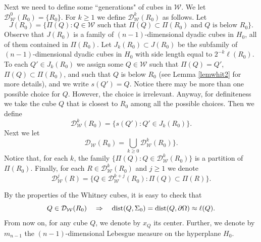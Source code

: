 \documentclass[11pt]{amsart}
\newcommand{\DD}{{\mathcal D}}
\newcommand{\WW}{{\mathcal W}}
\newcommand{\dist}{{\rm dist}}
\theoremstyle{definition}
\theoremstyle{remark}
\newtheorem{rem}[theorem]{\bf Remark}
\numberwithin{equation}{section}
\begin{document}
Next we need to define some ``generations" of cubes in $\WW$.
We let $\DD_\WW^0(R_0) = \{R_0\}$. For $k\geq 1$ we define $\DD_\WW^k(R_0)$ as follows.
Let 
\begin{equation}\label{eqjr0}
J(R_0) = \{\Pi(Q):Q\in\WW \mbox{ such that $\Pi(Q)\subset \Pi(R_0)$ and $Q$ is below $R_0$}\}.
\end{equation}
Observe that $J(R_0)$ is a family of $(n-1)$-dimensional dyadic cubes in $H_0$, all of them contained in 
$\Pi(R_0)$. Let  $J_k(R_0)\subset J(R_0)$ be the subfamily of $(n-1)$-dimensional dyadic cubes in $H_0$ with side length equal to $2^{-k}\ell(R_0)$.
 To each $Q'\in J_k(R_0)$ we assign some $Q\in\WW$ such that $\Pi(Q)=Q'$, $\Pi(Q)\subset \Pi(R_0)$, and such that $Q$ is below $R_0$ (see Lemma \ref{lemwhit2} for more details), and we write $s(Q')=Q$. Notice there may be
more than one possible choice for $Q$. However, the choice is irrelevant. Anyway, for definiteness
we take the cube $Q$ that is closest to $R_0$ among all the possible choices. Then we define
$$\DD_\WW^k(R_0) = \{s(Q'):Q'\in J_k(R_0)\}.$$
 Next we let 
$$\DD_\WW(R_0) = \bigcup_{k\geq0} \DD_\WW^k(R_0)\}.$$
Notice that, for each $k$, the family $\{\Pi(Q):Q\in\DD_\WW^k(R_0)\}$ is a partition of $\Pi(R_0)$.
Finally, for each $R\in\DD_\WW^k(R_0)$ and $j\geq1$ we denote
\begin{equation*}%
\DD_\WW^j(R) = \{Q\in\DD_\WW^{k+j}(R_0):\Pi(Q)\subset\Pi(R)\}.
\end{equation*}


By the properties of the Whitney cubes, it is easy to check that
$$Q\in\DD_\WW(R_0)\quad \Rightarrow\quad \dist(Q,\Sigma_0) = \dist(Q,\partial\Omega)
\approx\ell(Q).$$
From now on, for any cube $Q$, we denote by $x_Q$ its center. Further, we denote
by $m_{n-1}$ the $(n-1)$-dimensional Lebesgue measure on the hyperplane $H_0$.
\end{document}
